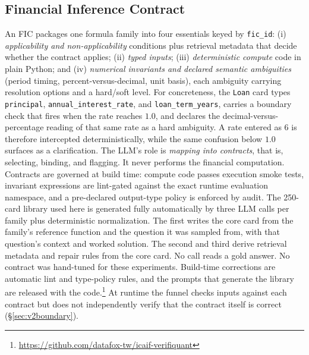 \documentclass[sigconf]{acmart}
\begin{document}
\subsection{Financial Inference Contract}
An FIC packages one formula family into four essentials keyed by \texttt{fic\_id}: (i) \emph{applicability and non-applicability} conditions plus retrieval metadata that decide whether the contract applies; (ii) \emph{typed inputs}; (iii) \emph{deterministic compute} code in plain Python; and (iv) \emph{numerical invariants and declared semantic ambiguities} (period timing, percent-versus-decimal, unit basis), each ambiguity carrying resolution options and a hard/soft level.
For concreteness, the \texttt{Loan} card types \texttt{principal}, \texttt{annual\_interest\_rate}, and \texttt{loan\_term\_years}, carries a boundary check that fires when the rate reaches $1.0$, and declares the decimal-versus-percentage reading of that same rate as a hard ambiguity. A rate entered as $6$ is therefore intercepted deterministically, while the same confusion below $1.0$ surfaces as a clarification.
The LLM's role is \emph{mapping into contracts}, that is, selecting, binding, and flagging. It never performs the financial computation.
Contracts are governed at build time: compute code passes execution smoke tests, invariant expressions are lint-gated against the exact runtime evaluation namespace, and a pre-declared output-type policy is enforced by audit.
The 250-card library used here is generated fully automatically by three LLM calls per family plus deterministic normalization. The first writes the core card from the family's reference function and the question it was sampled from, with that question's context and worked solution. The second and third derive retrieval metadata and repair rules from the core card. No call reads a gold answer.
No contract was hand-tuned for these experiments. Build-time corrections are automatic lint and type-policy rules, and the prompts that generate the library are released with the code.\footnote{\url{https://github.com/datafox-tw/icaif-verifiquant}}
At runtime the funnel checks inputs against each contract but does not independently verify that the contract itself is correct (\S\ref{sec:v2boundary}).
\end{document}
